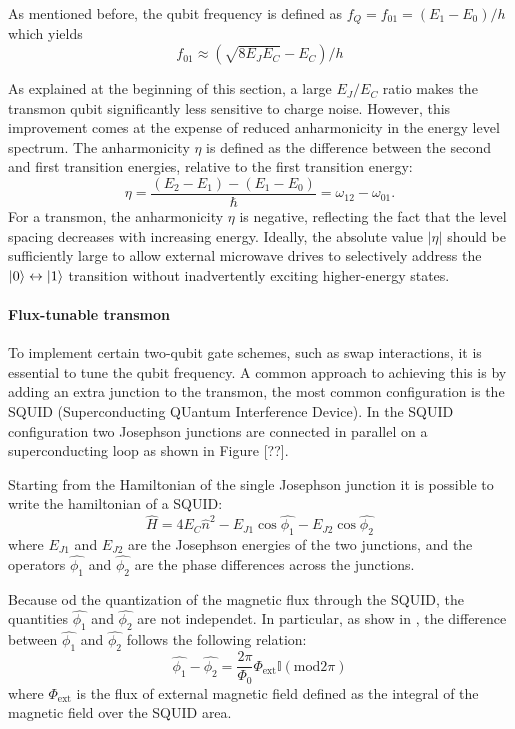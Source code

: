 As mentioned before, the qubit frequency is defined as $f_Q = f_{01} = (E_1 - E_0)/h$ which yields
\begin{equation}
    f_01 \approx (\sqrt{8E_JE_C} - E_C)/h
\end{equation}

As explained at the beginning of this section, a large $E_J/E_C$ ratio makes the transmon qubit significantly less sensitive to charge noise. 
However, this improvement comes at the expense of reduced anharmonicity in the energy level spectrum. 
The anharmonicity $\eta$ is defined as the difference between the second and first transition energies, relative to the first transition energy:
\begin{equation}
    \eta = \frac{(E_2 - E_1) - (E_1 - E_0)}{\hbar} = \omega_{12} - \omega_{01}.
\end{equation}
For a transmon, the anharmonicity $\eta$ is negative, reflecting the fact that the level spacing decreases with increasing energy. 
Ideally, the absolute value  $|\eta|$ should be sufficiently large to allow external microwave drives to selectively address the $\ket{0}\leftrightarrow\ket{1}$ transition without inadvertently exciting higher-energy states.


\paragraph{Flux-tunable transmon}
To implement certain two-qubit gate schemes, such as swap interactions, it is essential to tune the qubit frequency. 
A common approach to achieving this is by adding an extra junction to the transmon, the most common configuration is the SQUID (Superconducting QUantum Interference Device).
In the SQUID configuration two Josephson junctions are connected in parallel on a superconducting loop as shown in Figure [??].

Starting from the Hamiltonian of the single Josephson junction it is possible to write the hamiltonian of a SQUID:
\begin{equation}\label{eq:SQUID_Hamiltonian}
    \hat{H} = 4E_C\hat{n}^2 - E_{J1}\cos{\hat{\phi_1}} - E_{J2}\cos{\hat{\phi_2}}
\end{equation}
where $E_{J1}$ and $E_{J2}$ are the Josephson energies of the two junctions, and the operators $\hat{\phi_1}$ and $\hat{\phi_2}$ are the phase differences across the junctions.

Because od the quantization of the magnetic flux through the SQUID, the quantities $\hat{\phi_1}$ and $\hat{\phi_2}$ are not independet. 
In particular, as show in \cite{manenti_quantum_2023}, the difference between $\hat{\phi_1}$ and $\hat{\phi_2}$ follows the following relation:
\begin{equation}\label{eq:phases_relation}
    \hat{\phi_1} - \hat{\phi_2} = \frac{2\pi}{\Phi_0}\Phi_{\text{ext}}\mathbb{I}(\text{mod}2\pi)
\end{equation}
where $\Phi_{\text{ext}}$ is the flux of external magnetic field defined as the integral of the magnetic field over the SQUID area.

